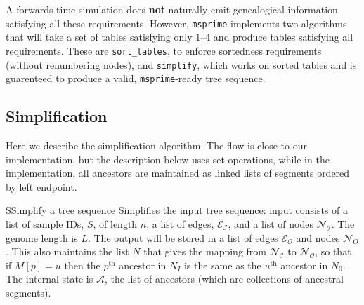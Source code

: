 \documentclass{article}
\newcommand{\msprime}{\texttt{msprime}}
\begin{document}
A forwards-time simulation does \textbf{not} naturally emit genealogical information
satisfying all these requirements.
However, \msprime{} implements two algorithms that will take a set of tables
satisfying only 1--4 and produce tables satisfying all requirements.
These are \texttt{sort\_tables}, to enforce sortedness requirements (without renumbering nodes),
and \texttt{simplify}, which works on sorted tables
and is guarenteed to produce a valid, \msprime{}-ready tree sequence.



\subsection*{Simplification}

Here we describe the simplification algorithm.
The flow is close to our implementation,
but the description below uses set operations,
while in the implementation,
all ancestors are maintained as linked lists of segments
ordered by left endpoint.

\begin{taocpalg}{S}{Simplify a tree sequence}
{Simplifies the input tree sequence:
    input consists of 
    a list of sample IDs, $S$, of length $n$,
    a list of edges, $\mathcal{E_I}$,
    and a list of nodes $\mathcal{N_I}$.
    The genome length is $L$.
    The output will be stored in a list of edges $\mathcal{E_O}$ 
    and nodes $\mathcal{N}_O$.
    This also maintains the list $N$ that gives the mapping 
    from $\mathcal{N_I}$ to $\mathcal{N_O}$,
    so that if $M[p] = u$ then the $p^\text{th}$ ancestor in $N_I$
    is the same as the $u^\text{th}$ ancestor in $N_0$.
    The internal state is $\mathcal{A}$, the list of ancestors
    (which are collections of ancestral segments).
}





\end{taocpalg}
\end{document}
